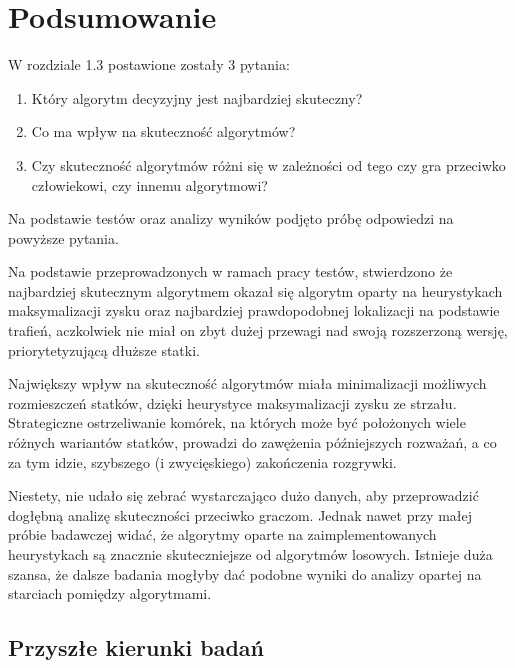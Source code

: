 \newpage %
\section{Podsumowanie}

W rozdziale 1.3 postawione zostały 3 pytania:

\begin{enumerate}
    \item Który algorytm decyzyjny jest najbardziej skuteczny?
    \item Co ma wpływ na skuteczność algorytmów?
    \item Czy skuteczność algorytmów różni się w zależności od tego czy gra przeciwko człowiekowi, czy innemu algorytmowi?
\end{enumerate}

Na podstawie testów oraz analizy wyników podjęto próbę odpowiedzi na powyższe pytania.

Na podstawie przeprowadzonych w ramach pracy testów, stwierdzono że najbardziej skutecznym algorytmem okazał się algorytm oparty na heurystykach maksymalizacji zysku oraz najbardziej prawdopodobnej lokalizacji na podstawie trafień, aczkolwiek nie miał on zbyt dużej przewagi nad swoją rozszerzoną wersję, priorytetyzującą dłuższe statki.

Największy wpływ na skuteczność algorytmów miała minimalizacji możliwych rozmieszczeń statków, dzięki heurystyce maksymalizacji zysku ze strzału. Strategiczne ostrzeliwanie komórek, na których może być położonych wiele różnych wariantów statków, prowadzi do zawężenia późniejszych rozważań, a co za tym idzie, szybszego (i zwycięskiego) zakończenia rozgrywki.

Niestety, nie udało się zebrać wystarczająco dużo danych, aby przeprowadzić dogłębną analizę skuteczności przeciwko graczom. Jednak nawet przy małej próbie badawczej widać, że algorytmy oparte na zaimplementowanych heurystykach są znacznie skuteczniejsze od algorytmów losowych. Istnieje duża szansa, że dalsze badania mogłyby dać podobne wyniki do analizy opartej na starciach pomiędzy algorytmami.

\subsection{Przyszłe kierunki badań}

